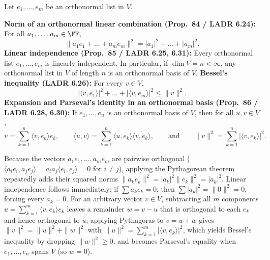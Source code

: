 \documentclass[10pt]{scrartcl}
\newcommand{\ip}[2]{\langle #1,#2\rangle}
\begin{document}
\begin{proposition*}
  Let $e_1,\dots,e_m$ be an orthonormal list in $V$.
  \begin{enumerate}[(a)]
    \ii \textbf{Norm of an orthonormal linear combination (Prop.~84 / LADR 6.24):} For all $a_1,\dots,a_m\in\FF$,
    \[
      \|a_1e_1+\dots+a_me_m\|^2 = |a_1|^2 + \dots + |a_m|^2.
    \]
    \ii \textbf{Linear independence (Prop.~85 / LADR 6.25, 6.31):} Every orthonormal list $e_1,\dots,e_m$ is linearly independent. In particular, if $\dim V=n<\infty$, any orthonormal list in $V$ of length $n$ is an orthonormal basis of $V$.
    \ii \textbf{Bessel's inequality (LADR 6.26):} For every $v\in V$,
    \[
      |\ip v{e_1}|^2 + \dots + |\ip v{e_m}|^2 \le \|v\|^2.
    \]
    \ii \textbf{Expansion and Parseval's identity in an orthonormal basis (Prop.~86 / LADR 6.28, 6.30):} If $e_1,\dots,e_n$ is an orthonormal basis of $V$, then for all $u,v\in V$,
    \[
      v = \sum_{k=1}^n \ip v{e_k}e_k, \qquad \ip uv = \sum_{k=1}^n \ip u{e_k}\overline{\ip v{e_k}}, \qquad\text{and}\qquad \|v\|^2 = \sum_{k=1}^n |\ip v{e_k}|^2.
    \]
  \end{enumerate}
\end{proposition*}
\begin{ideabox}
  Because the vectors $a_1e_1,\dots,a_me_m$ are pairwise orthogonal ($\ip{a_ie_i}{a_je_j}=a_i\overline{a_j}\ip{e_i}{e_j}=0$ for $i\ne j$), applying the Pythagorean theorem repeatedly adds their squared norms $\|a_ke_k\|^2=|a_k|^2\|e_k\|^2=|a_k|^2$. Linear independence follows immediately: if $\sum a_ke_k=0$, then $\sum |a_k|^2=\|0\|^2=0$, forcing every $a_k=0$. For an arbitrary vector $v\in V$, subtracting all $m$ components $u=\sum_{k=1}^m\ip v{e_k}e_k$ leaves a remainder $w=v-u$ that is orthogonal to each $e_k$ and hence orthogonal to $u$; applying Pythagoras to $v=u+w$ gives $\|v\|^2=\|u\|^2+\|w\|^2$ with $\|u\|^2=\sum_{k=1}^m|\ip v{e_k}|^2$, which yields Bessel's inequality by dropping $\|w\|^2\ge 0$, and becomes Parseval's equality when $e_1,\dots,e_n$ spans $V$ (so $w=0$).
\end{ideabox}
\end{document}
